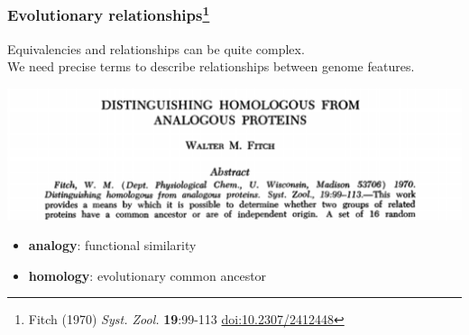 \begin{frame}
  \frametitle{Evolutionary relationships\footnote{\tiny{Fitch (1970) \textit{Syst. Zool.} \textbf{19}:99-113 \href{http://dx.doi.org/10.2307/2412448}{doi:10.2307/2412448}}}}
  Equivalencies and relationships can be quite complex. \\
  We need precise terms to describe relationships between genome features. \\
  \begin{center}
    \includegraphics[width=1\textwidth]{images/fitch}  
  \end{center}  
  \begin{itemize}
    \item \textbf{analogy}: functional similarity
    \item \textbf{homology}: evolutionary common ancestor
  \end{itemize}    
\end{frame}

